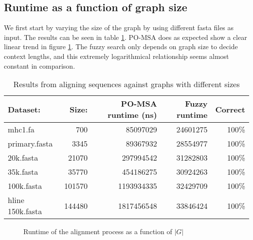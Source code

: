 \documentclass[thesis.tex]{subfiles}
\begin{document}
\subsection*{Runtime as a function of graph size}
We first start by varying the size of the graph by using different fasta files as input. The results can be seen in table \ref{tab:results_g}. PO-MSA does as expected show a clear linear trend in figure \ref{fig:runtime_G}. The fuzzy search only depends on graph size to decide context lengths, and this extremely logarithmical relationship seems almost constant in comparison.
\clearpage
\begin{table}
  \begin{tabular}{|l|r|r|r|r|}
    \hline \textbf{Dataset:} & \textbf{Size:} & \textbf{PO-MSA runtime (ns)} & \textbf{Fuzzy runtime} & \textbf{Correct}\\ \hline
    mhc1.fa & 700 & 85097029 & 24601275 & 100\%\\ \hline
    primary.fasta & 3345 & 89367932 & 28554977 & 100\%\\ \hline
    20k.fasta & 21070 & 297994542 & 31282803 & 100\%\\ \hline
    35k.fasta & 35770 & 454186275 & 30924263 & 100\%\\ \hline
    100k.fasta & 101570 & 1193934335 & 32429709 & 100\%\\ hline
    150k.fasta & 144480 & 1817456548 & 33846424 & 100\%\\ \hline
  \end{tabular}
  \caption{Results from aligning sequences against graphs with different sizes}
  \label{tab:results_g}
\end{table}
\begin{figure}
  \caption{Runtime of the alignment process as a function of $|G|$}
  \label{fig:runtime_G}
\end{figure}
\clearpage
\end{document}
